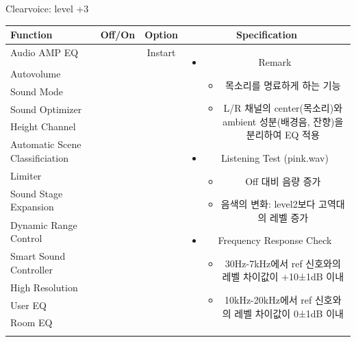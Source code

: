 \documentclass{beamer}
\begin{document}
	
	\begin{frame}[t]{Clearvoice: level +3}
		\begin{tiny}
			\begin{tabular}{@{}lccc@{}}
				\toprule
				Function & Off/On & Option & Specification \\
				\midrule
				Audio AMP EQ & \color{black}{Off} & Instart &
				\multirow{14}{60mm}{
					\begin{itemize}
						\item Remark
						\begin{itemize}
							\item 목소리를 명료하게 하는 기능
							\item L/R 채널의 center(목소리)와 ambient 성분(배경음, 잔향)을 분리하여 EQ 적용
						\end{itemize}
						\item Listening Test (pink.wav)
						\begin{itemize}
							\item Off 대비 음량 증가
							\item 음색의 변화: level2보다 고역대의 레벨 증가
						\end{itemize}
						\item Frequency Response Check
						\begin{itemize}
							\item 30Hz-7kHz에서 ref 신호와의 레벨 차이값이 +10±1dB 이내
							\item 10kHz-20kHz에서 ref 신호와의 레벨 차이값이 0±1dB 이내
						\end{itemize}
					\end{itemize}
				} \\
				\color{blue}{Clearvoice} & \color{blue}{On} & \color{blue}{+3} & \\
				Autovolume & \color{black}{Off} & & \\
				Sound Mode & \color{black}{Off} & & \\
				Sound Optimizer & \color{black}{Off} & & \\
				Height Channel & \color{black}{Off} & & \\
				Automatic Scene Classificiation & \color{black}{Off} & & \\
				Limiter & \color{black}{Off} & & \\
				Sound Stage Expansion & \color{black}{Off} & & \\
				Dynamic Range Control & \color{black}{Off} & & \\
				Smart Sound Controller & \color{black}{Off} & & \\
				High Resolution & \color{black}{Off} & & \\
				User EQ & \color{black}{Off} & & \\
				Room EQ & \color{black}{Off} & & \\
				\color{blue}{OSD Volume} & \color{blue}{On} &  \color{blue}{Vol.40} & \\
				\midrule
			\end{tabular}
		\end{tiny}
		

\end{frame}
\end{document}
